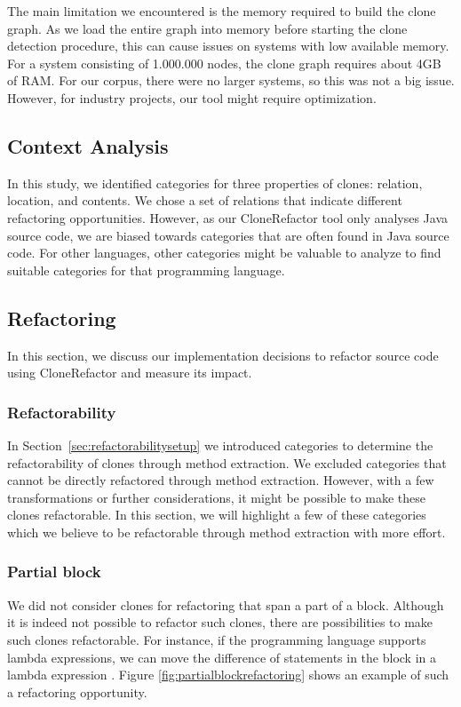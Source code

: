 The main limitation we encountered is the memory required to build the clone graph. As we load the entire graph into memory before starting the clone detection procedure, this can cause issues on systems with low available memory. For a system consisting of 1.000.000 nodes, the clone graph requires about 4GB of RAM. For our corpus, there were no larger systems, so this was not a big issue. However, for industry projects, our tool might require optimization.

\subsection{Context Analysis}
In this study, we identified categories for three properties of clones: relation, location, and contents. We chose a set of relations that indicate different refactoring opportunities. However, as our CloneRefactor tool only analyses Java source code, we are biased towards categories that are often found in Java source code. For other languages, other categories might be valuable to analyze to find suitable categories for that programming language.

\subsection{Refactoring}
In this section, we discuss our implementation decisions to refactor source code using CloneRefactor and measure its impact.

\subsubsection{Refactorability} \label{sec:discussrefactorability}
In Section~\ref{sec:refactorabilitysetup} we introduced categories to determine the refactorability of clones through method extraction. We excluded categories that cannot be directly refactored through method extraction. However, with a few transformations or further considerations, it might be possible to make these clones refactorable. In this section, we will highlight a few of these categories which we believe to be refactorable through method extraction with more effort.

\subsubsection{Partial block} \label{sec:partialblockdiscussion}
We did not consider clones for refactoring that span a part of a block. Although it is indeed not possible to refactor such clones, there are possibilities to make such clones refactorable. For instance, if the programming language supports lambda expressions, we can move the difference of statements in the block in a lambda expression \cite{tsantalis2017clone}. Figure \ref{fig:partialblockrefactoring} shows an example of such a refactoring opportunity.

